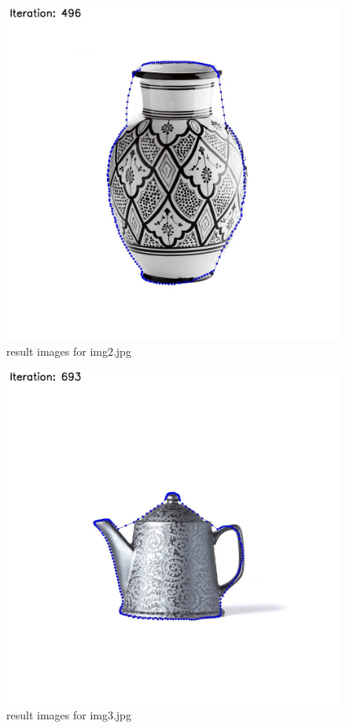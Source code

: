 \documentclass[12pt,a4paper]{report}
\begin{document}
\begin{figure}[!htb]
    \centering
      \includegraphics[height=0.3\paperheight]{result_img/result_img2.jpg}
    \caption{result images for img2.jpg}
\end{figure}
\begin{figure}[!htb]
    \centering
      \includegraphics[height=0.3\paperheight]{result_img/result_img3.jpg}
    \caption{result images for img3.jpg}
\end{figure}
\end{document}
